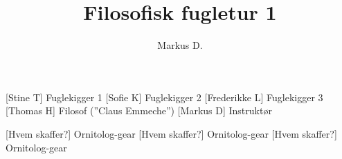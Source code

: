 \documentclass[a4paper,12pt]{article}
\title{Filosofisk fugletur 1}
\author{Markus D.}
\begin{document}
\maketitle




\begin{roles}
	[Stine T] Fuglekigger 1
	[Sofie K] Fuglekigger 2
	[Frederikke L] Fuglekigger 3
	[Thomas H] Filosof (''Claus Emmeche'')
		[Markus D] Instruktør
\end{roles}


\begin{props}
	[Hvem skaffer?] Ornitolog-gear
	[Hvem skaffer?] Ornitolog-gear
	[Hvem skaffer?] Ornitolog-gear
\end{props}
\end{document}
